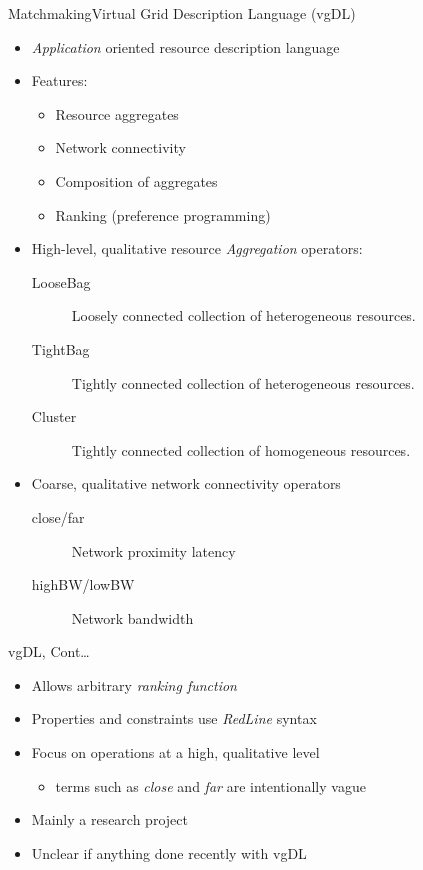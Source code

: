 \documentclass{beamer}
\begin{document}
\begin{frame}{Matchmaking}{Virtual Grid Description Language (vgDL)}
\begin{itemize}
 \item {\em Application} oriented resource description language
 \item Features:
 \begin{itemize}
  \item Resource aggregates
  \item Network connectivity
  \item Composition of aggregates
  \item Ranking (preference programming)
 \end{itemize}
 \item High-level, qualitative resource {\em Aggregation} operators:
 \begin{description}
  \item[LooseBag] Loosely connected collection of heterogeneous resources.
  \item[TightBag] Tightly connected collection of heterogeneous resources.
  \item[Cluster] Tightly connected collection of homogeneous resources.
 \end{description}
 \item Coarse, qualitative network connectivity operators
 \begin{description}
  \item[close/far] Network proximity latency
  \item[highBW/lowBW] Network bandwidth
 \end{description}
\end{itemize}
\end{frame}

\begin{frame}{vgDL, Cont\ldots}
\begin{itemize}
 \item Allows arbitrary {\em ranking function}
 \item Properties and constraints use {\em RedLine} syntax
 \item Focus on operations at a high, qualitative level
 \begin{itemize}
  \item terms such as {\em close} and {\em far} are intentionally vague
 \end{itemize}
 \item Mainly a research project
 \item Unclear if anything done recently with vgDL
\end{itemize}
\end{frame}
\end{document}
